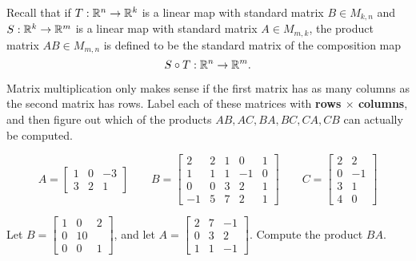 \begin{applicationActivities}

\begin{observation}
Recall that if \(T: \mathbb{R}^n \rightarrow \mathbb{R}^k\) is a linear map with standard matrix \(B \in M_{k,n}\) and \(S: \mathbb{R}^k \rightarrow \mathbb{R}^m\) is a linear map with standard matrix \(A \in M_{m,k}\), the product matrix \(AB \in M_{m,n}\) is defined to be the standard matrix of the composition map \[S \circ T: \mathbb{R}^n \rightarrow \mathbb{R}^m.\]
\end{observation}


\begin{activity}{5}
Matrix multiplication only makes sense if the first matrix has as many
columns as the second matrix has rows. Label each of these matrices
with \textbf{rows \(\times\) columns}, and then figure out which of
the products \(AB,AC,BA,BC,CA,CB\) can actually be computed.

\[
  A = \begin{bmatrix}1&0&-3\\3&2&1\end{bmatrix}
    \hspace{2em}
  B = \begin{bmatrix}2&2&1&0&1\\1&1&1&-1&0\\0&0&3&2&1\\-1&5&7&2&1\end{bmatrix}
    \hspace{2em}
  C = \begin{bmatrix}2&2\\0&-1\\3&1\\4&0\end{bmatrix}
\]
\end{activity}




\begin{activity}{10}
Let \(B=\begin{bmatrix}1 & 0  & 2 \\ 0 & 1 0 \\ 0 & 0 & 1 \end{bmatrix}\), and let \(A=\begin{bmatrix} 2 & 7 & -1 \\ 0 & 3 & 2 \\ 1 & 1 & -1 \end{bmatrix}\).  Compute the product \(BA\).
\end{activity}


\end{applicationActivities}
